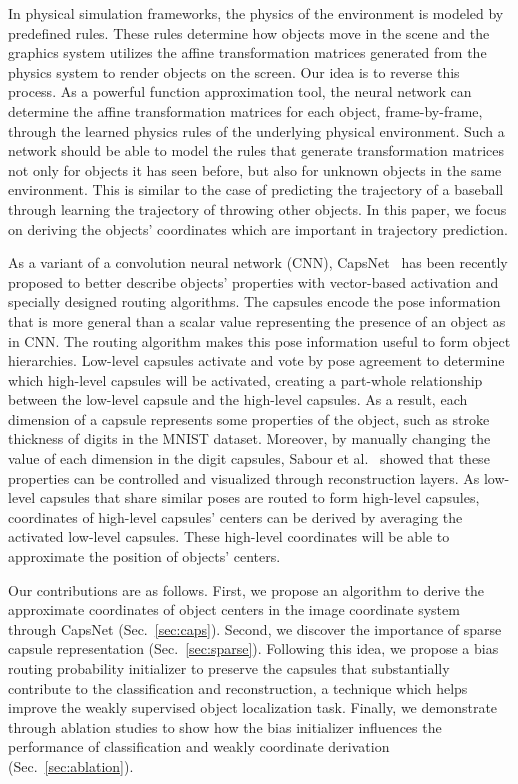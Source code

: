 \documentclass{article}
\begin{document}
In physical simulation frameworks, the physics of the environment is modeled by predefined rules. These rules determine how objects move in the scene and the graphics system utilizes the affine transformation matrices generated from the physics system to render objects on the screen. Our idea is to reverse this process. As a powerful function approximation tool, the neural network can determine the affine transformation matrices for each object, frame-by-frame, through the learned physics rules of the underlying physical environment. Such a network should be able to model the rules that generate transformation matrices not only for objects it has seen before, but also for unknown objects in the same environment. This is similar to the case of predicting the trajectory of a baseball through learning the trajectory of throwing other objects. In this paper, we focus on deriving the objects' coordinates which are important in trajectory prediction. 

As a variant of a convolution neural network (CNN), CapsNet~\cite{sabour2017dynamic} has been recently proposed to better describe objects' properties with vector-based activation and specially designed routing algorithms. The capsules encode the pose information that is more general than a scalar value representing the presence of an object as in CNN. The routing algorithm makes this pose information useful to form object hierarchies. Low-level capsules activate and vote by pose agreement to determine which high-level capsules will be activated, creating a part-whole relationship between the low-level capsule and the high-level capsules. As a result, each dimension of a capsule represents some properties of the object, such as stroke thickness of digits in the MNIST dataset. Moreover, by manually changing the value of each dimension in the digit capsules, Sabour et al.~\cite{sabour2017dynamic} showed that these properties can be controlled and visualized through reconstruction layers. As low-level capsules that share similar poses are routed to form high-level capsules, coordinates of high-level capsules' centers can be derived by averaging the activated low-level capsules. These high-level coordinates will be able to approximate the position of objects' centers.

Our contributions are as follows. First, we propose an algorithm to derive the approximate coordinates of object centers in the image coordinate system through CapsNet (Sec.~\ref{sec:caps}). Second, we discover the importance of sparse capsule representation (Sec.~\ref{sec:sparse}). Following this idea, we propose a bias routing probability initializer to preserve the capsules that substantially contribute to the classification and reconstruction, a technique which helps improve the weakly supervised object localization task. Finally, we demonstrate through ablation studies to show how the bias initializer influences the performance of classification and weakly coordinate derivation (Sec.~\ref{sec:ablation}). 
\end{document}
